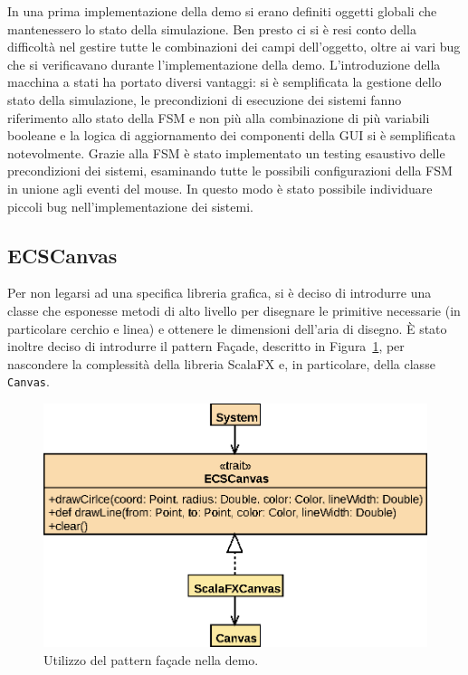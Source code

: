 In una prima implementazione della demo si erano definiti oggetti globali che mantenessero lo stato della simulazione.
Ben presto ci si è resi conto della difficoltà nel gestire tutte le combinazioni dei campi dell'oggetto, oltre
ai vari bug che si verificavano durante l'implementazione della demo.
L'introduzione della macchina a stati ha portato diversi vantaggi: si è semplificata la gestione dello
stato della simulazione, le precondizioni di esecuzione dei sistemi fanno riferimento allo stato della FSM e non più
alla combinazione di più variabili booleane e la logica di aggiornamento dei componenti della GUI si è semplificata
notevolmente.
Grazie alla FSM è stato implementato un testing esaustivo delle precondizioni dei sistemi, esaminando tutte
le possibili configurazioni della FSM in unione agli eventi del mouse.
In questo modo è stato possibile individuare piccoli bug nell'implementazione dei sistemi.

\subsection{ECSCanvas}\label{subsec:ecscanvas}
Per non legarsi ad una specifica libreria grafica, si è deciso di introdurre una classe che esponesse metodi di alto livello
per disegnare le primitive necessarie (in particolare cerchio e linea) e ottenere le dimensioni dell'aria di disegno.
È stato inoltre deciso di introdurre il pattern Façade, descritto in Figura~\ref{fig:facade}, per nascondere la complessità della libreria ScalaFX e,
in particolare, della classe \texttt{Canvas}.

\begin{figure}[H]
    \centering
    \includegraphics[width=\textwidth]{img/Facade}
    \caption{Utilizzo del pattern façade nella demo.}\label{fig:facade}
\end{figure}

